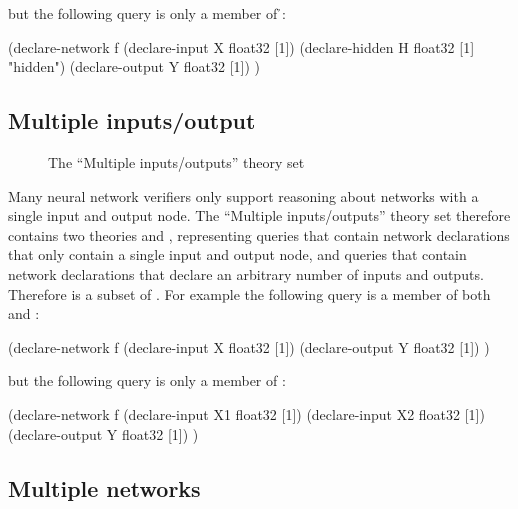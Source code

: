 but the following query is only a member of \h{}:

\begin{code}[style=lbnf]
(declare-network f
    (declare-input  X float32 [1])
    (declare-hidden H float32 [1] "hidden")
    (declare-output Y float32 [1])
)
\end{code}

\subsection{Multiple inputs/output}
\label{sec:multiple-inputs-outputs}

\begin{figure}[h]
\centering
{}
\caption{The ``Multiple inputs/outputs'' theory set}
\label{fig:multiple-inputs-outputs-set}
\end{figure}

Many neural network verifiers only support reasoning about networks with a single input and output node. The ``Multiple inputs/outputs'' theory set therefore contains two theories \sio{} and \mio{}, representing queries that contain network declarations that only contain a single input and output node, and queries that contain network declarations that declare an arbitrary number of inputs and outputs. Therefore \sio{} is a subset of \mio{}. For example the following query is a member of both \sio{} and \mio{}:

\begin{code}[style=lbnf]
(declare-network f
    (declare-input  X float32 [1])
    (declare-output Y float32 [1])
)
\end{code}

but the following query is only a member of \mio{}:

\begin{code}[style=lbnf]
(declare-network f
    (declare-input  X1 float32 [1])
    (declare-input  X2 float32 [1])
    (declare-output Y  float32 [1])
)
\end{code}

\subsection{Multiple networks}
\label{sec:multiple-networks}

